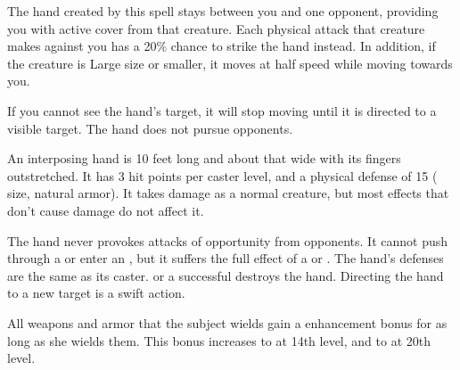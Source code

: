 \spellrng{\rngmed}
\begin{spelleffect}
  The hand created by this spell stays between you and one opponent, providing you with active cover from that creature. Each physical attack that creature makes against you has a 20\% chance to strike the hand instead. In addition, if the creature is Large size or smaller, it moves at half speed while moving towards you. 
  \par If you cannot see the hand's target, it will stop moving until it is directed to a visible target. The hand does not pursue opponents.
  \par An interposing hand is 10 feet long and about that wide with its fingers outstretched. It has 3 hit points per caster level, and a physical defense of 15 ( size,  natural armor). It takes damage as a normal creature, but most effects that don't cause damage do not affect it.
\end{spelleffect}
\begin{spellnotes}
  \par The hand never provokes attacks of opportunity from opponents. It cannot push through a  or enter an , but it suffers the full effect of a  or . The hand's defenses are the same as its caster.
   or a successful  destroys the hand. Directing the hand to a new target is a swift action.
\end{spellnotes}

\spellrng{\rngclose}
\spelldur{\durshort}
\begin{spelleffect}
  All weapons and armor that the subject wields gain a  enhancement bonus for as long as she wields them. This bonus increases to  at 14th level, and to  at 20th level.
\end{spelleffect}

